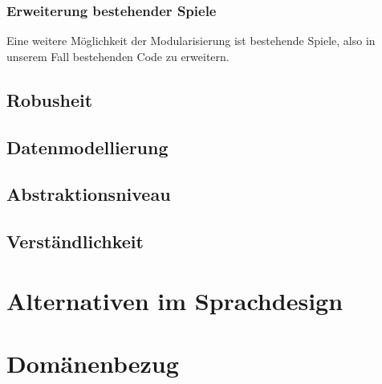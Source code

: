 \subsubsection{Erweiterung bestehender Spiele}
\label{subsub:erweiterung_bestehender_spiele}
	Eine weitere Möglichkeit der Modularisierung ist bestehende Spiele, also in unserem Fall bestehenden Code zu erweitern.

\subsection{Robusheit} %
\label{sub:robusheit}

\subsection{Datenmodellierung} %
\label{sub:datenmodellierung}

\subsection{Abstraktionsniveau} %
\label{sub:abstraktionsniveau}

\subsection{Verständlichkeit} %
\label{sub:verstandlichkeit}



\section{Alternativen im Sprachdesign} %
\label{sec:alternativen_im_sprachdesign}


\section{Domänenbezug} %
\label{sec:domanenbezug}

